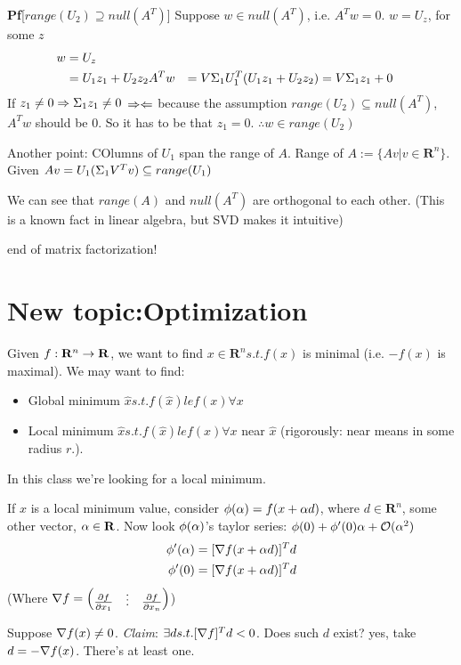 \textbf{Pf}[$range(U_2) \supseteq null(A^T)$]
Suppose $w \in null(A^T)$, i.e. $A^Tw = 0$. 
$w = U_z$, for some $z$
\begin{align*}
  w &= U_z\\
&= U_1z_1 + U_2z_2
A^Tw &= V\Sigma_1 U_1^T (U_1z_1+U_2z_2)
&=V\Sigma_1 z_1 + 0
\end{align*}
If $z_1 \neq 0 \Rightarrow \Sigma_1z_1 \neq 0$ $\Rightarrow\Leftarrow$ because the
assumption $range(U_2)\subseteq null(A^T)$, $A^Tw$ should be 0. So it
has to be that $z_1 = 0$.  $\therefore w \in range(U_2)$

Another point:
COlumns of $U_1$ span the range of $A$. Range of $A:=\{Av | v\in
\mathbf{R}^n\}$.
Given $Av = U_1(\Sigma_1 V^Tv)\subseteq range(U_1)$

We can see that $range(A)$ and $null(A^T)$ are orthogonal to each
other. (This is a known fact in linear algebra, but SVD makes it intuitive)

end of matrix factorization!
\section{New topic:Optimization}
Given $f: \mathbf{R}^n \rightarrow \mathbf{R}$, we want to find $x\in
\mathbf{R}^n s.t. f(x)$ is minimal (i.e. $-f(x)$ is maximal).
We may want to find:
\begin{itemize}
\item Global minimum $\hat x s.t. f(\hat x) le f(x) \forall x$
\item Local  minimum $\hat x s.t. f(\hat x) le f(x) \forall x$ near $\hat x$
  (rigorously: near means in some radius $r$.).
\end{itemize}
In this class we're looking for a local minimum.

If $x$ is a local minimum value, consider $\phi(\alpha) = f(x+\alpha d) $, where $d\in
\mathbf{R}^n$, some other vector, $\alpha \in \mathbf{R}$.
Now look $\phi(\alpha)$'s taylor series: $  \phi(0) + \phi'(0)\alpha + \mathcal{O}(\alpha^2)$
\begin{align*}
\phi'(\alpha) &= [\nabla f(x+\alpha d)]^Td\\
\phi'(0) &= [\nabla f(x+\alpha d)]^Td\\
\end{align*}
(Where $\nabla f =
\begin{pmatrix}
  \frac{\partial f}{\partial x_1} &\vdots &  \frac{\partial f}{\partial x_n}
\end{pmatrix}$)

Suppose $\nabla f(x) \neq 0$. \emph{Claim}: $\exists d s.t. [\nabla
f]^Td < 0$.
Does such $d$ exist? yes, take $d = -\nabla f(x)$. There's at least
one.

